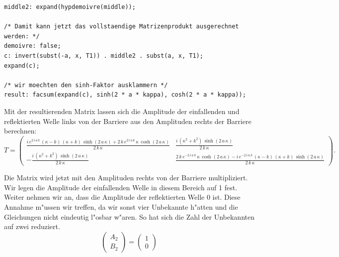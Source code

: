 \begin{refsection}
\begin{lstlisting}[style=Maxima]
middle2: expand(hypdemoivre(middle));

/* Damit kann jetzt das vollstaendige Matrizenprodukt ausgerechnet werden: */
demoivre: false;
c: invert(subst(-a, x, T1)) . middle2 . subst(a, x, T1);
expand(c);

/* wir moechten den sinh-Faktor ausklammern */
result: facsum(expand(c), sinh(2 * a * kappa), cosh(2 * a * kappa));

\end{lstlisting}

Mit der resultierenden Matrix lassen sich die Amplitude der einfallenden und reflektierten Welle links von der Barriere aus den Amplituden rechts der Barriere berechnen:
\[
T =
\begin{pmatrix}
\frac{i\,e^{2\,i\,a\,k}\,\left(\kappa-k\right)\,\left(\kappa+k
 \right)\,\sinh \left(2\,a\,\kappa\right)+2\,k\,e^{2\,i\,a\,k}\,
 \kappa\,\cosh \left(2\,a\,\kappa\right)}{2\,k\,\kappa}
&
\frac{i\,
 \left(\kappa^2+k^2\right)\,\sinh \left(2\,a\,\kappa\right)}{2\,
 k\,\kappa}
\\
-\frac{i\,\left(\kappa^2+k^2\right)\,\sinh \left(2\,a\,
 \kappa\right)}{2\,k\,\kappa}
&
\frac{2\,k\,e^ {- 2\,i\,a\,k }\,
 \kappa\,\cosh \left(2\,a\,\kappa\right)-i\,e^ {- 2\,i\,a\,k }\,
 \left(\kappa-k\right)\,\left(\kappa+k\right)\,\sinh \left(2\,a\,
 \kappa\right)}{2\,k\,\kappa}
\end{pmatrix}.
\]

Die Matrix wird jetzt mit den Amplituden rechts von der Barriere multipliziert. 
Wir legen die Amplitude der einfallenden Welle in diesem Bereich auf 1 fest. 
Weiter nehmen wir an, dass die Amplitude der reflektierten Welle 0 ist.
Diese Annahme m"ussen wir treffen, da wir sonst vier Unbekannte h"atten und die Gleichungen nicht eindeutig l"osbar w"aren.
So hat sich die Zahl der Unbekannten auf zwei reduziert.
\[
\begin{pmatrix}
A_2
\\
B_2
\end{pmatrix}
=
\begin{pmatrix}
1
\\
0
\end{pmatrix}
\]


\end{refsection}
